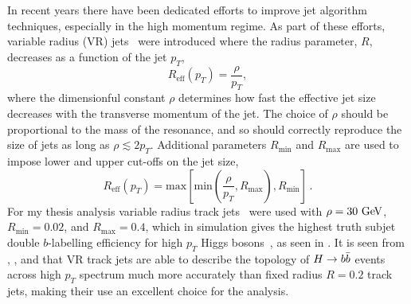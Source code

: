 In recent years there have been dedicated efforts to improve jet algorithm techniques, especially in the high momentum regime.
As part of these efforts, variable radius (VR) jets~\cite{Krohn:2009zg,ATL-PHYS-PUB-2017-010} were introduced where the radius parameter, $R$, decreases as a function of the jet $p_{T}$,
\[
 R_{\mathrm{eff}} \left(p_{T}\right)= \frac{\rho}{p_{T}},
\]
where the dimensionful constant $\rho$ determines how fast the effective jet size decreases with the transverse momentum of the jet.
The choice of $\rho$ should be proportional to the mass of the resonance, and so should correctly reproduce the size of jets as long as $\rho \lesssim 2 p_{T}$.
Additional parameters $R_{\mathrm{min}}$ and $R_{\mathrm{max}}$ are used to impose
lower and upper cut-offs on the jet size,
\[
 R_{\mathrm{eff}} \left(p_{T}\right)= \mathrm{max}\left[\mathrm{min}\left(\frac{\rho}{p_{T}},R_{\mathrm{max}}\right),R_{\mathrm{min}}\right]\,.
\]
For my thesis analysis variable radius track jets~\cite{Zenz:2010hfa} were used with $\rho=30~\text{Ge\kern-0.1em V}$, $R_{\mathrm{min}}=0.02$, and $R_{\mathrm{max}}=0.4$, which in simulation gives the highest truth subjet double $b$-labelling efficiency for high $p_{T}$ Higgs bosons~\cite{ATL-PHYS-PUB-2017-010}, as seen in .
It is seen from , , and  that VR track jets are able to describe the topology of $H \to b\bar{b}$ events across high $p_{T}$ spectrum much more accurately than fixed radius $R=0.2$ track jets, making their use an excellent choice for the analysis.

